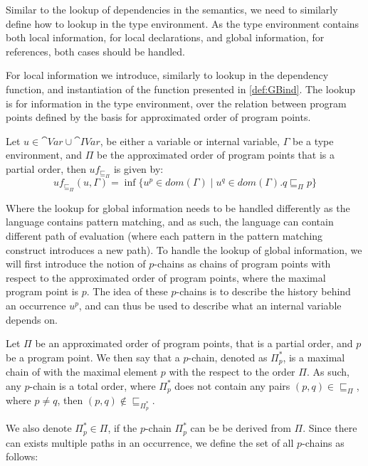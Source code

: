 \documentclass[../../master.tex]{subfiles}
\begin{document}
Similar to the lookup of dependencies in the semantics, we need to similarly define how to lookup in the type environment.
As the type environment contains both local information, for local declarations, and global information, for references, both cases should be handled.

For local information we introduce, similarly to lookup in the dependency function, and instantiation of the function presented in \cref{def:GBind}.
The lookup is for information in the type environment, over the relation between program points defined by the basis for approximated order of program points.

\begin{definition}[]\label{def:GBindPi}
	Let $u\in \cat{Var}\cup\cat{IVar}$, be either a variable or internal variable, $\Gamma$ be a type environment, and $\Pi$ be the approximated order of program points that is a partial order, then $uf_{\sqsubseteq_\Pi}$ is given by:
	$$uf_{\sqsubseteq_\Pi}(u,\Gamma)=\inf\{u^p\in dom(\Gamma)\mid u^q\in dom(\Gamma).q\sqsubseteq_\Pi p\}$$
\end{definition}

Where the lookup for global information needs to be handled differently as the language contains pattern matching, and as such, the language can contain different path of evaluation (where each pattern in the pattern matching construct introduces a new path).
To handle the lookup of global information, we will first introduce the notion of $p$-chains as chains of program points with respect to the approximated order of program points, where the maximal program point is $p$.
The idea of these $p$-chains is to describe the history behind an occurrence $u^p$, and can thus be used to describe what an internal variable depends on.

\begin{definition}[$p$-chains]
	Let $\Pi$ be an approximated order of program points, that is a partial order, and $p$ be a program point.
	We then say that a $p$-chain, denoted as $\Pi_p^{*}$, is a maximal chain of with the maximal element $p$ with the respect to the order $\Pi$.
	As such, any $p$-chain is a total order, where $\Pi_p^{*}$ does not contain any pairs $(p,q)\in\sqsubseteq_\Pi$, where $p\neq q$, then $(p,q)\notin\sqsubseteq_{\Pi_p^{*}}$.
\end{definition}

We also denote $\Pi_p^{*}\in\Pi$, if the $p$-chain $\Pi_p^{*}$ can be be derived from $\Pi$.
Since there can exists multiple paths in an occurrence, we define the set of all $p$-chains as follows:
\end{document}

